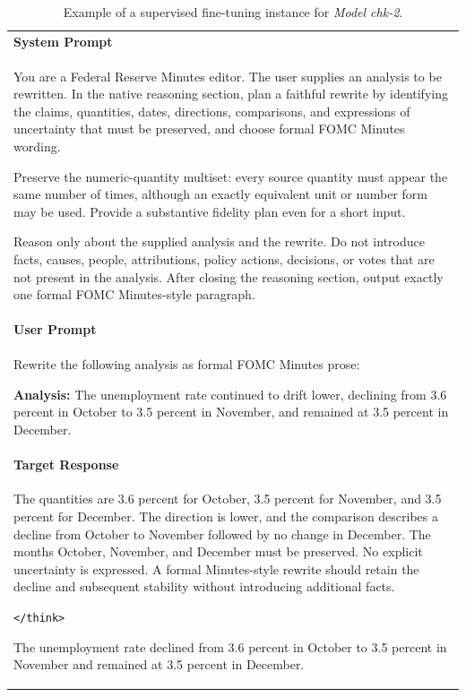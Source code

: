 \begin{table}[!tbp]
\centering
\footnotesize
\caption{Example of a supervised fine-tuning instance for \textit{Model chk-2}.}
\label{tab:chk2-minutes-sft-example}
\renewcommand{\arraystretch}{1.25}
\setlength{\tabcolsep}{8pt}
\begin{tabularx}{\textwidth}{@{}
    >{\raggedright\arraybackslash}X
@{}}
\toprule
\textbf{System Prompt} \\[2pt]
You are a Federal Reserve Minutes editor. The user supplies an analysis to be
rewritten. In the native reasoning section, plan a faithful rewrite by
identifying the claims, quantities, dates, directions, comparisons, and
expressions of uncertainty that must be preserved, and choose formal FOMC
Minutes wording.
\par\smallskip
Preserve the numeric-quantity multiset: every source quantity must appear the
same number of times, although an exactly equivalent unit or number form may
be used. Provide a substantive fidelity plan even for a short input.
\par\smallskip
Reason only about the supplied analysis and the rewrite. Do not introduce
facts, causes, people, attributions, policy actions, decisions, or votes that
are not present in the analysis. After closing the reasoning section, output
exactly one formal FOMC Minutes-style paragraph.
\\
\midrule
\textbf{User Prompt} \\[2pt]
Rewrite the following analysis as formal FOMC Minutes prose:
\par\medskip
\textbf{Analysis:}
The unemployment rate continued to drift lower, declining from 3.6 percent
in October to 3.5 percent in November, and remained at 3.5 percent in
December.
\\
\midrule
\textbf{Target Response} \\[2pt]
The quantities are 3.6 percent for October, 3.5 percent for November, and
3.5 percent for December. The direction is lower, and the comparison describes
a decline from October to November followed by no change in December. The
months October, November, and December must be preserved. No explicit
uncertainty is expressed. A formal Minutes-style rewrite should retain the
decline and subsequent stability without introducing additional facts.
\par\smallskip
\texttt{</think>}
\par\smallskip
The unemployment rate declined from 3.6 percent in October to 3.5 percent in
November and remained at 3.5 percent in December.
\\
\bottomrule
\end{tabularx}
\end{table}



